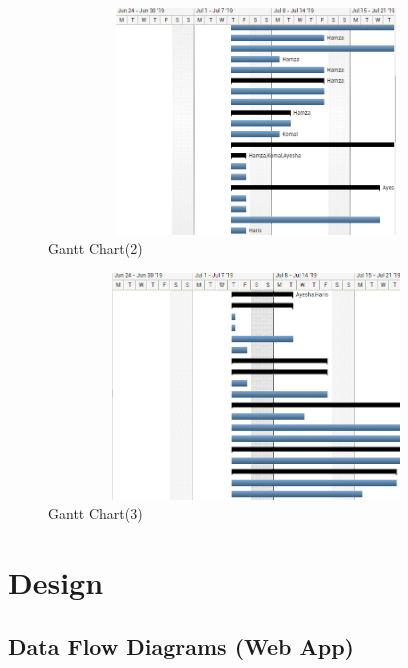 \documentclass[12pt]{article}
\begin{document}
\newpage
\begin{figure}[h]
  \centering
  \includegraphics[width=11cm, height=6cm]{GanttChart2}
  \caption{Gantt Chart(2)}
\end{figure}
\mbox\\
\mbox\\
\begin{figure}[h]
  \centering
  \includegraphics[width=11cm, height=6cm]{GanttChart3}
  \caption{Gantt Chart(3)}
\end{figure}

\newpage
\section{Design}

\subsection{Data Flow Diagrams (Web App)}
\end{document}

